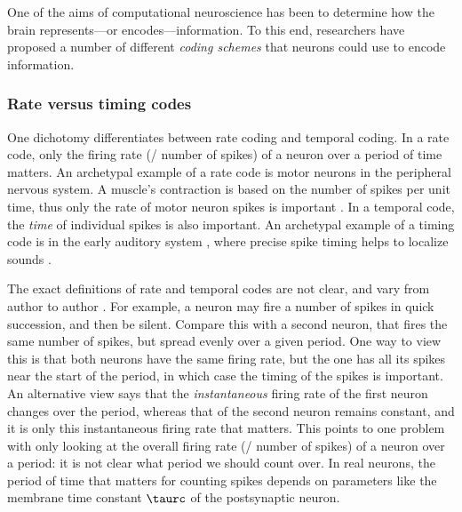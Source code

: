 
One of the aims of computational neuroscience has been to determine
how the brain represents---or encodes---information.
To this end, researchers have proposed a number of different
\emph{coding schemes} that neurons could use to encode information.


\subsubsection{Rate versus timing codes}

One dichotomy differentiates between rate coding and temporal coding.
In a rate code, only the firing rate (\ie/ number of spikes)
of a neuron over a period of time matters.
An archetypal example of a rate code
is motor neurons in the peripheral nervous system.
A muscle's contraction is based on the number of spikes per unit time,
thus only the rate of motor neuron spikes is important \parencite{Gerstner1997}.
In a temporal code, the \emph{time} of individual spikes is also important.
An archetypal example of a timing code is in the early auditory system \parencite{Gerstner1997},
where precise spike timing helps to localize sounds \parencite{Chase2006}.

The exact definitions of rate and temporal codes are not clear,
and vary from author to author \parencite{Dayan2001}.
For example, a neuron may fire a number of spikes in quick succession,
and then be silent.
Compare this with a second neuron, that fires the same number of spikes,
but spread evenly over a given period.
One way to view this is that both neurons have the same firing rate,
but the one has all its spikes near the start of the period,
in which case the timing of the spikes is important.
An alternative view says that the \emph{instantaneous} firing rate of
the first neuron changes over the period,
whereas that of the second neuron remains constant,
and it is only this instantaneous firing rate that matters.
This points to one problem with only looking at the overall firing rate
(\ie/ number of spikes) of a neuron over a period:
it is not clear what period we should count over.
In real neurons,
the period of time that matters for counting spikes depends on parameters like
the membrane time constant $\taurc$ of the postsynaptic neuron.

